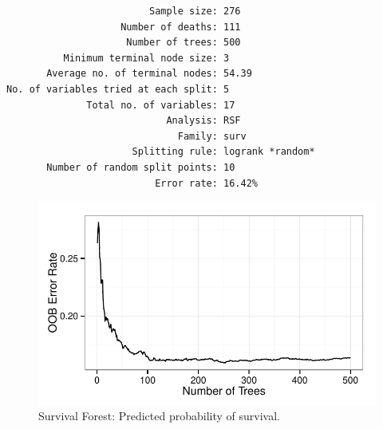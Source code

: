 \documentclass[nojss]{jss}\usepackage[]{graphicx}\usepackage[]{color}
\makeatletter
\def\maxwidth{ %
  \ifdim\Gin@nat@width>\linewidth
    \linewidth
  \else
    \Gin@nat@width
  \fi
}
\newenvironment{kframe}{%
 \def\at@end@of@kframe{}%
 \ifinner\ifhmode%
  \def\at@end@of@kframe{\end{minipage}}%
  \begin{minipage}{\columnwidth}%
 \fi\fi%
 \def\FrameCommand##1{\hskip\@totalleftmargin \hskip-\fboxsep
 \colorbox{shadecolor}{##1}\hskip-\fboxsep
     \hskip-\linewidth \hskip-\@totalleftmargin \hskip\columnwidth}%
 \MakeFramed {\advance\hsize-\width
   \@totalleftmargin\z@ \linewidth\hsize
   \@setminipage}}%
 {\par\unskip\endMakeFramed%
 \at@end@of@kframe}
\newenvironment{knitrout}{}{} %
\makeatother
\begin{document}

\begin{knitrout}\footnotesize
{}\color{fgcolor}\begin{kframe}
\begin{verbatim}
                         Sample size: 276
                    Number of deaths: 111
                     Number of trees: 500
          Minimum terminal node size: 3
       Average no. of terminal nodes: 54.39
No. of variables tried at each split: 5
              Total no. of variables: 17
                            Analysis: RSF
                              Family: surv
                      Splitting rule: logrank *random*
       Number of random split points: 10
                          Error rate: 16.42%
\end{verbatim}
\end{kframe}\begin{figure}[!htpb]

{\centering \includegraphics[width=\maxwidth]{figure/vig-surv-rf-error-1} 

}

\caption[Survival Forest]{Survival Forest: Predicted probability of survival.\label{fig:surv-rf-error}}
\end{figure}


\end{knitrout}
\end{document}
